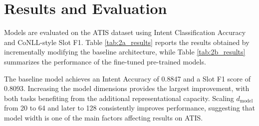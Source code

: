 \section{Results and Evaluation}
\label{sec:results_2}

Models are evaluated on the ATIS dataset using Intent Classification Accuracy and CoNLL-style Slot F1. Table \ref{tab:2a_results} reports the results obtained by incrementally modifying the baseline architecture, while Table \ref{tab:2b_results} summarizes the performance of the fine-tuned pre-trained models.

\begin{table}[H]
\centering
\small
\caption{Incremental optimization results for Part 2.A (From Scratch).}
\label{tab:2a_results}
\end{table}

The baseline model achieves an Intent Accuracy of 0.8847 and a Slot F1 score of 0.8093. Increasing the model dimensions provides the largest improvement, with both tasks benefiting from the additional representational capacity. Scaling $d_{\text{model}}$ from 20 to 64 and later to 128 consistently improves performance, suggesting that model width is one of the main factors affecting results on ATIS.

